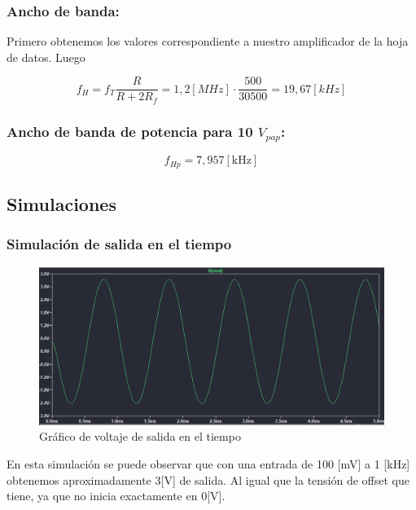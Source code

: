 \subsubsection{Ancho de banda:}

 Primero obtenemos los valores correspondiente a nuestro amplificador de la hoja de datos. Luego
 
\[ f_H = f_{T} \frac{R}{R+2 R_f} = 1,2 [MHz] \cdot \frac{500}{30500} = 19,67 [kHz] \]

\subsubsection{Ancho de banda de potencia para 10 $V_{pap}$:}
\[ f_{Hp}=7,957[\mathrm{kHz}] \]

  
 
\newpage

\subsection{Simulaciones}
\subsubsection{Simulación de salida en el tiempo}
 
\begin{figure}[h!]
    \centering
    \includegraphics[width=0.80\linewidth]{img/tiempo.png}
    \caption{Gráfico de voltaje de salida en el tiempo}
    \label{fig:tiempo}
\end{figure}

En esta simulación se puede observar que con una entrada de 100 [mV] a 1 [kHz] obtenemos aproximadamente 3[V] de salida. Al igual que la tensión de offset que tiene, ya que no inicia exactamente en 0[V].

